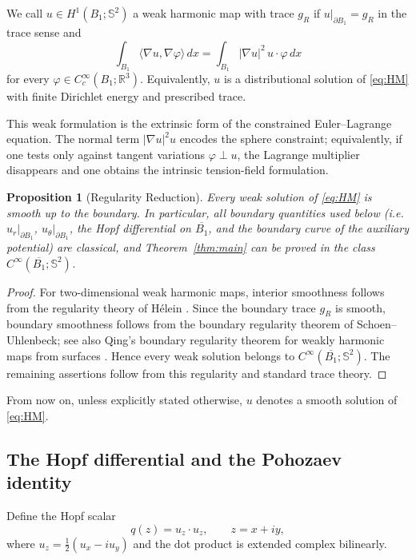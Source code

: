\documentclass[11pt]{amsart}
\numberwithin{equation}{section}
\newtheorem{proposition}[theorem]{Proposition}
\theoremstyle{remark}
\newcommand{\R}{\mathbb{R}}
\newcommand{\Sph}{\mathbb{S}^2}
\begin{document}
We call $u\in H^1(B_1;\Sph)$ a weak harmonic map with trace $g_R$ if $u|_{\partial B_1}=g_R$ in the trace sense and
\[
\int_{B_1}\langle \nabla u,\nabla\varphi\rangle\,dx=\int_{B_1}|\nabla u|^2\,u\cdot\varphi\,dx
\]
for every $\varphi\in C_c^\infty(B_1;\R^3)$. Equivalently, $u$ is a distributional solution of \eqref{eq:HM} with finite Dirichlet energy and
prescribed trace.

This weak formulation is the extrinsic form of the constrained Euler--Lagrange equation. The normal term \(|\nabla u|^2u\) encodes the sphere
constraint; equivalently, if one tests only against tangent variations \(\varphi\perp u\), the Lagrange multiplier disappears and one obtains
the intrinsic tension-field formulation.

\begin{proposition}[Regularity Reduction]\label{prop:regularity}
Every weak solution of \eqref{eq:HM} is smooth up to the boundary. In particular, all boundary quantities used below (i.e. $u_r|_{\partial
B_1}$, $u_\theta|_{\partial B_1}$, the Hopf differential on $\overline{B_1}$, and the boundary curve of the auxiliary potential) are
classical, and Theorem~\ref{thm:main} can be proved in the class $C^\infty(\overline{B_1};\Sph)$.
\end{proposition}

\begin{proof}
For two-dimensional weak harmonic maps, interior smoothness follows from the regularity theory of H\'elein \cite{Helein}. Since the boundary
trace $g_R$ is smooth, boundary smoothness follows from the boundary regularity theorem of Schoen--Uhlenbeck; see also Qing's boundary
regularity theorem for weakly harmonic maps from surfaces \cite{SchoenUhlenbeckBoundary,Qing1993}. Hence every weak solution belongs to
$C^\infty(\overline{B_1};\Sph)$. The remaining assertions follow from this regularity and standard trace theory.
\end{proof}

From now on, unless explicitly stated otherwise, $u$ denotes a smooth solution of \eqref{eq:HM}.

\subsection{The Hopf differential and the Pohozaev identity}

Define the Hopf scalar
\[
q(z)=u_z\cdot u_z,
\qquad z=x+iy,
\]
where $u_z=\frac12(u_x-iu_y)$ and the dot product is extended complex bilinearly.
\end{document}
